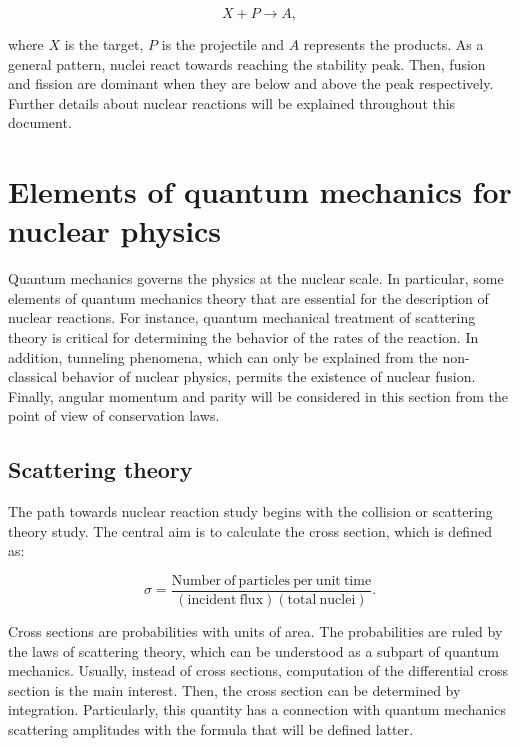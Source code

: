 \documentclass[openany]{book}
\begin{document}
\begin{equation} \label{eq:reactionGeneral}
	X + P  \rightarrow A,
\end{equation}

where $X$ is the target, $P$ is the projectile and $A$ represents the products.  As a general pattern, nuclei react towards reaching the stability peak. Then, fusion and fission are dominant when they are below and above the peak respectively. Further details about nuclear reactions will be explained throughout this document.

\section{Elements of quantum mechanics for nuclear physics} \label{sec:quantumMechanics}


Quantum mechanics governs the physics at the nuclear scale. In particular, some elements of quantum mechanics theory that are essential for the description of nuclear reactions. For instance, quantum mechanical treatment of scattering theory is critical for determining the behavior of the rates of the reaction. In addition, tunneling phenomena, which can only be explained from the non-classical behavior of nuclear physics, permits the existence of nuclear fusion. Finally, angular momentum and parity will be considered in this section from the point of view of conservation laws. 

\subsection{Scattering theory} \label{sub:scatteringTheory}

The path towards nuclear reaction study begins with the collision or scattering theory study. The central aim is to calculate the cross section, which is defined as:  

\begin{equation} \label{eq:crossSection_definition}
	\sigma  = \frac{\mathrm{Number \ of \ particles \ per \ unit \ time}}{(\mathrm{incident \ flux} )(\mathrm{total \ nuclei})}.
\end{equation}

Cross sections are probabilities with units of area. The probabilities are ruled by the laws of scattering theory, which can be understood as a subpart of quantum mechanics. Usually, instead of cross sections, computation of the differential cross section is the main interest.  Then, the cross section can be determined by integration. Particularly, this quantity has  a connection with quantum mechanics scattering amplitudes with the formula that will be defined latter. \\
\end{document}
